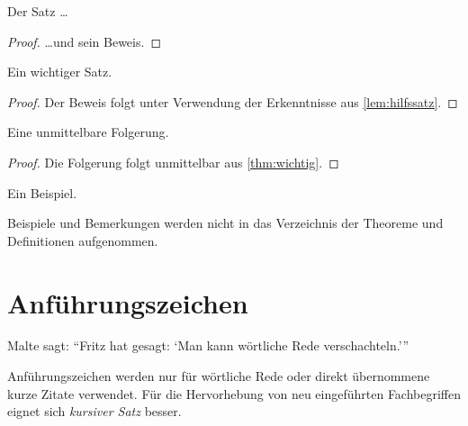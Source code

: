 \begin{Lemma}
  \label{lem:hilfssatz}
  Der Satz \ldots
\end{Lemma}

\begin{proof}
  \ldots und sein Beweis.
\end{proof}

\begin{Theorem}
  \label{thm:wichtig}
  Ein wichtiger Satz.
\end{Theorem}

\begin{proof}
  Der Beweis folgt unter Verwendung der Erkenntnisse aus \vref{lem:hilfssatz}.
\end{proof}

\begin{Korollar}
  Eine unmittelbare Folgerung.
\end{Korollar}

\begin{proof}
  Die Folgerung folgt unmittelbar aus \vref{thm:wichtig}.
\end{proof}

\begin{Beispiel}
  Ein Beispiel.
\end{Beispiel}

\begin{Bemerkung}
  Beispiele und Bemerkungen werden nicht in das Verzeichnis der Theoreme und Definitionen aufgenommen.
\end{Bemerkung}

\section{Anführungszeichen}

Malte sagt: \enquote{Fritz hat gesagt: \enquote{Man kann wörtliche Rede verschachteln.}}

Anführungszeichen werden nur für wörtliche Rede oder direkt übernommene kurze Zitate verwendet. Für die Hervorhebung von neu eingeführten Fachbegriffen eignet sich \emph{kursiver Satz} besser.
